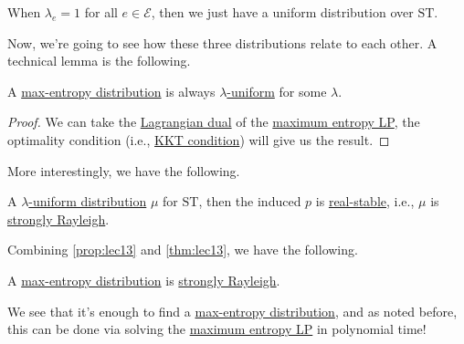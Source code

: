 \begin{note}
	When \(\lambda _e = 1\) for all \(e\in \mathcal{E} \), then we just have a uniform distribution over \(\mathrm{ST}\).
\end{note}

Now, we're going to see how these three distributions relate to each other. A technical lemma is the following.

\begin{proposition}\label{prop:lec13}
	A \hyperref[def:max-entropy-distribution]{max-entropy distribution} is always \hyperref[def:lambda-uniform]{\(\lambda \)-uniform} for some \(\lambda \).
\end{proposition}
\begin{proof}
	We can take the \href{https://en.wikipedia.org/wiki/Duality_(optimization)}{Lagrangian dual} of the \hyperref[eq:max-entropy]{maximum entropy LP}, the optimality condition (i.e., \href{https://en.wikipedia.org/wiki/Karush%E2%80%93Kuhn%E2%80%93Tucker_conditions}{KKT condition}) will give us the result.
\end{proof}

More interestingly, we have the following.

\begin{theorem}\label{thm:lec13}
	A \hyperref[def:lambda-uniform]{\(\lambda \)-uniform distribution} \(\mu \) for \(\mathrm{ST} \), then the induced \(p\) is \hyperref[def:real-stable]{real-stable}, i.e., \(\mu \) is \hyperref[def:strongly-Rayleigh-distribution]{strongly Rayleigh}.
\end{theorem}

Combining \autoref{prop:lec13} and \autoref{thm:lec13}, we have the following.

\begin{corollary}
	A \hyperref[def:max-entropy-distribution]{max-entropy distribution} is \hyperref[def:strongly-Rayleigh-distribution]{strongly Rayleigh}.
\end{corollary}

We see that it's enough to find a \hyperref[def:max-entropy-distribution]{max-entropy distribution}, and as noted before, this can be done via solving the \hyperref[eq:max-entropy]{maximum entropy LP} in polynomial time!